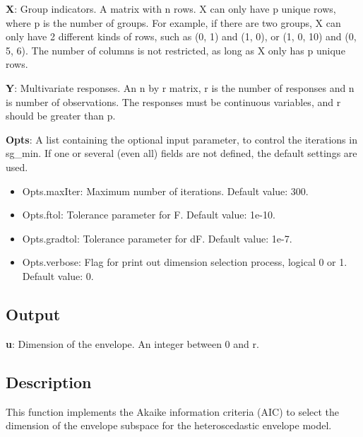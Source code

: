 \documentclass[a4paper,11pt,openany]{memoir}
\begin{document}
\begin{par}
\textbf{X}: Group indicators. A matrix with n rows.  X can only have p unique  rows, where p is the number of groups. For example, if there are two groups, X can only have 2 different kinds of rows, such as (0, 1) and (1, 0), or (1, 0, 10) and (0, 5, 6).  The number of columns is not restricted, as long as X only has p unique rows.
\end{par} \vspace{1em}
\begin{par}
\textbf{Y}: Multivariate responses. An n by r matrix, r is the number of responses and n is number of observations. The responses must be continuous variables, and r should be greater than p.
\end{par} \vspace{1em}
\begin{par}
\textbf{Opts}: A list containing the optional input parameter, to control the iterations in sg\_min. If one or several (even all) fields are not defined, the default settings are used.
\end{par} \vspace{1em}
\begin{itemize}
\setlength{\itemsep}{-1ex}
   \item Opts.maxIter: Maximum number of iterations.  Default value: 300.
   \item Opts.ftol: Tolerance parameter for F.  Default value: 1e-10.
   \item Opts.gradtol: Tolerance parameter for dF.  Default value: 1e-7.
   \item Opts.verbose: Flag for print out dimension selection process, logical 0 or 1. Default value: 0.
\end{itemize}


\subsection*{Output}

\begin{par}
\textbf{u}: Dimension of the envelope. An integer between 0 and r.
\end{par} \vspace{1em}


\subsection*{Description}

\begin{par}
This function implements the Akaike information criteria (AIC) to select the dimension of the envelope subspace for the heteroscedastic envelope model.
\end{par} \vspace{1em}
\end{document}
